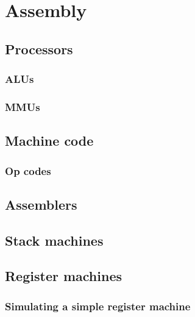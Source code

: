 \chapter{Assembly}

\section{Processors}

\subsection{ALUs}

\subsection{MMUs}

\section{Machine code}

\subsection{Op codes}

\section{Assemblers}

\section{Stack machines}

\section{Register machines}

\subsection{Simulating a simple register machine}

